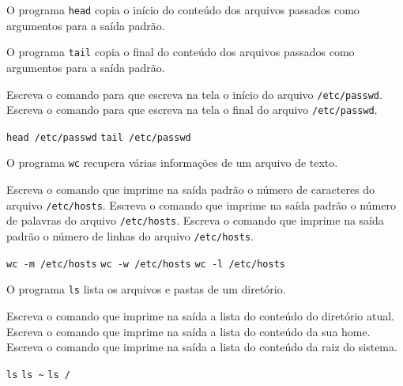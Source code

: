 \begin{Exercise}[label={0015}, difficulty={0}, origin={coreutils}]
  O programa \lstinline+head+ copia o início do conteúdo dos arquivos passados
  como argumentos para a saída padrão.

  O programa \lstinline+tail+ copia o final do conteúdo dos arquivos passados
  como argumentos para a saída padrão.

  \Question Escreva o comando para que escreva na tela o início do arquivo
  \lstinline+/etc/passwd+.
  \Question Escreva o comando para que escreva na tela o final do arquivo
  \lstinline+/etc/passwd+.
\end{Exercise}
\begin{Answer}[ref={0015}]
  \Question \lstinline+head /etc/passwd+
  \Question \lstinline+tail /etc/passwd+
\end{Answer}

\begin{Exercise}[label={0016}, difficulty={0}, origin={coreutils}]
  O programa \lstinline+wc+ recupera várias informações de um arquivo de texto.

  \Question Escreva o comando que imprime na saída padrão o número de
  caracteres do arquivo \lstinline+/etc/hosts+.
  \Question Escreva o comando que imprime na saída padrão o número de palavras
  do arquivo \lstinline+/etc/hosts+.
  \Question Escreva o comando que imprime na saída padrão o número de linhas
  do arquivo \lstinline+/etc/hosts+.
\end{Exercise}
\begin{Answer}[ref={0016}]
  \Question \lstinline+wc -m /etc/hosts+
  \Question \lstinline+wc -w /etc/hosts+
  \Question \lstinline+wc -l /etc/hosts+
\end{Answer}

\begin{Exercise}[label={0017}, difficulty={1}, origin={coreutils}]
  O programa \lstinline+ls+ lista os arquivos e pastas de um diretório.

  \Question Escreva o comando que imprime na saída a lista do conteúdo do
  diretório atual.
  \Question Escreva o comando que imprime na saída a lista do conteúdo da
  sua home.
  \Question Escreva o comando que imprime na saída a lista do conteúdo da
  raiz do sistema.
\end{Exercise}
\begin{Answer}[ref={0017}]
  \Question \lstinline+ls+
  \Question \lstinline+ls ~+
  \Question \lstinline+ls /+
\end{Answer}

